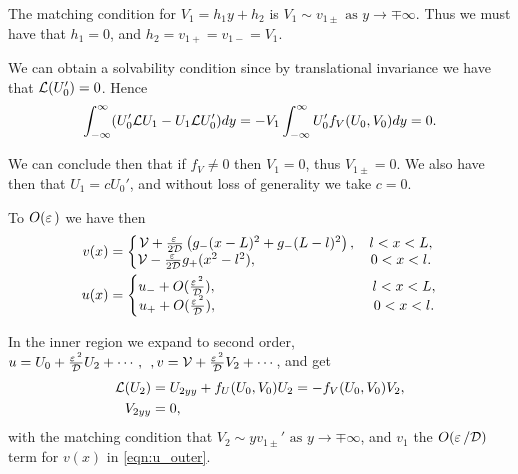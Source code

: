 The matching condition for $V_1 = h_1y+h_2$ is $V_1\sim v_{1\pm}\text{ as }y\rightarrow\mp\infty$. Thus we must have that $h_1=0$, and $h_2 = v_{1+} = v_{1-} = V_1$.

We can obtain a solvability condition since by translational invariance we have that $\mathcal{L}(U_0') = 0$. Hence
% 
\begin{equation*}
\begin{split}
\begin{aligned}
	\int_{-\infty}^{\infty}(U_0'\mathcal{L} U_1 - U_1\mathcal{L} U_0')dy = -V_1\int_{-\infty}^{\infty}U_0'f_V(U_0,V_0)dy = 0.
\end{aligned}
\end{split}
\end{equation*}
%

We can conclude then that if $f_V\neq0$ then $V_1=0$, thus $V_{1\pm}=0$. We also have then that $U_1 = cU_0'$, and without loss of generality we take $c=0$.

To $O(\varepsilon\,)$ we have then
% 
\begin{equation}
\label{eqn:u_outer}
	\begin{split}
	v(x) &= \left\{
	\begin{matrix}
	  \mathcal{V} + \frac{\varepsilon\,}{2\mathcal{D}}\left(g_-(x-L)^2 + g_-(L-l)^2 \right),&l<x<L,\\
	  \mathcal{V} - \frac{\varepsilon\,}{2\mathcal{D}}g_+(x^2-l^2),\hspace{1in}&0<x<l.
	\end{matrix}\right.\\
	u(x) &= \left\{
	\begin{matrix}
	  u_- + O(\frac{\varepsilon\,^2}{\mathcal{D}}),\hspace{1.43in}&l<x<L,\\
	  u_+ + O(\frac{\varepsilon\,^2}{\mathcal{D}}),\hspace{1.42in} &0<x<l.
	\end{matrix}\right.\\
	\end{split}
\end{equation}
% 

In the inner region we expand to second order, $u=U_0 + \frac{\varepsilon\,^2}{\mathcal{D}}U_2+\cdots,\hspace{1ex}, v = \mathcal{V} + \frac{\varepsilon\,^2}{\mathcal{D}}V_2+\cdots$, and get
% 
\begin{equation*}
\begin{split}
\begin{aligned}
	\mathcal{L}(U_2) &= U_{2yy}+f_U(U_0,V_0)U_2=-f_V(U_0,V_0)V_2,\\
	V_{2yy} &= 0,
\end{aligned}
\end{split}
\end{equation*}
%
with the matching condition that $V_2\sim yv_{1\pm}'\text{ as }y\rightarrow\mp\infty$, and $v_1$ the $O(\varepsilon\,/\mathcal{D})$ term for $v(x)$ in \eqref{eqn:u_outer}.

